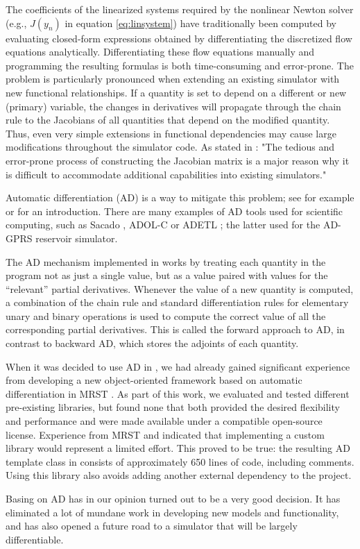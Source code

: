 The coefficients of the linearized systems required by the nonlinear Newton solver (e.g.,
$J(y_n)$ in equation \eqref{eq:linsystem}) have traditionally been computed by evaluating
closed-form expressions obtained by differentiating the discretized flow equations analytically.
Differentiating these flow equations manually and programming the resulting formulas 
is both time-consuming and error-prone. The problem is particularly 
pronounced when extending an existing simulator with new functional relationships. 
If a quantity is set to depend on a different or new (primary) variable, 
the changes in derivatives will propagate through the chain rule to 
the Jacobians of all quantities that depend on the modified quantity. 
Thus, even very simple extensions in functional dependencies may 
cause large modifications throughout the simulator code.
{\revised As stated in \cite{ad-gprs}: "The tedious and error-prone
process of constructing the Jacobian matrix is a major reason why it
is difficult to accommodate additional capabilities into existing
simulators." }

Automatic differentiation (AD) is a way to mitigate this problem; see for example
\citep{griewank:2008} or \citep{Neidinger2010} for an introduction.  There are many
examples of AD tools used for scientific computing, such as
{\revised Sacado \citep{sacado}, ADOL-C \citep{adol-c} or ADETL \citep{adetl}; the
latter used for the AD-GPRS \citep{ad-gprs, ad-gprs-website}}
reservoir simulator.

The AD mechanism implemented in \opm works by treating
each quantity in the program not as just a single value, but as a
value paired with values for the \enquote{relevant} partial derivatives. 
Whenever the value of a new quantity is computed, a combination of the chain rule
and standard differentiation rules for elementary unary and binary operations 
is used to compute the correct value of all the corresponding partial derivatives. 
This is called the forward approach to AD, in contrast to
backward AD, which stores the adjoints of each quantity.

{\revised
When it was decided to use AD in \opm, we had already gained
significant experience from developing a new object-oriented framework
based on automatic differentiation in MRST \citep{MRST-AD}. As part of
this work, we evaluated and tested different pre-existing libraries,
but found none that both provided the desired flexibility and
performance and were made available under a compatible open-source
license. Experience from MRST \citep{MRST-AD} and
\citep{Neidinger2010} indicated that implementing a custom library
would represent a limited effort. This proved to be true: the
resulting AD template class in \opm consists of approximately 650
lines of code, including comments. Using this library also avoids
adding another external dependency to the project.

Basing \opm on AD has in our opinion turned out to be
a very good decision. It has eliminated a lot of mundane work in
developing new models and functionality, and has also opened a future
road to a simulator that will be largely
differentiable.}

